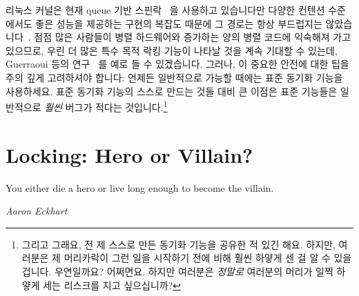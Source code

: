 리눅스 커널은 현재 queue 기반 스핀락~\cite{JonathanCorbet2014qspinlocks} 을
사용하고 있습니다만 다양한 컨텐션 수준에서도 좋은 성능을 제공하는 구현의 복잡도
때문에 그 경로는 항상 부드럽지는
않았습니다~\cite{CatalinMarinas2018qspinlockTLA,WillDeacon2018qspinlock}.
점점 많은 사람들이 병렬 하드웨어와 증가하는 양의 병렬 코드에 익숙해져 가고
있으므로, 우린 더 많은 특수 목적 락킹 기능이 나타날 것을 계속 기대할 수 있는데,
Guerraoui 등의 연구~\cite{Guerraoui:2019:LPA:3319851.3301501,HugoGuirouxPhD} 를
예로 들 수 있겠습니다.
그러나, 이 중요한 안전에 대한 팁을 주의 깊게 고려하셔야 합니다:
언제든 일반적으로 가능할 때에는 표준 동기화 기능을 사용하세요.
표준 동기화 기능의 스스로 만드는 것들 대비 큰 이점은 표준 기능들은 일반적으로
\emph{훨씬} 버그가 적다는 것입니다.\footnote{
	그리고 그래요, 전 제 스스로 만든 동기화 기능을 공유한 적 있긴 해요.
	하지만, 여러분은 제 머리카락이 그런 일을 시작하기 전에 비해 훨씬 하얗게
	센 걸 알 수 있을 겁니다.
	우연일까요?
	어쩌면요.
	하지만 여러분은 \emph{정말로} 여러분의 머리가 일찍 하얗게 세는 리스크를
	지고 싶으십니까?}

\section{Locking: Hero or Villain?}
\label{sec:locking:Locking: Hero or Villain?}
%
\epigraph{You either die a hero or live long enough to become the villain.}
	 {\emph{Aaron Eckhart}}


